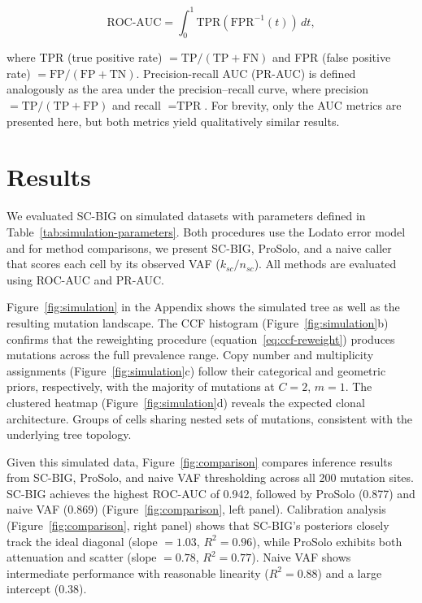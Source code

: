 \documentclass[10pt]{article}
\begin{document}
\begin{equation}
    \text{ROC-AUC} = \int_0^1 \text{TPR}(\text{FPR}^{-1}(t)) \, dt
    ,
\end{equation}

where TPR (true positive rate) $= \text{TP}/(\text{TP}+\text{FN})$ and FPR (false positive rate) $= \text{FP}/(\text{FP}+\text{TN})$.
Precision-recall AUC (PR-AUC) is defined analogously as the area under the precision--recall curve, where precision $= \text{TP}/(\text{TP}+\text{FP})$ and recall $= \text{TPR}$.
For brevity, only the AUC metrics are presented here, but both metrics yield qualitatively similar results.

\section{Results}

We evaluated SC-BIG on simulated datasets with parameters defined in Table~\ref{tab:simulation-parameters}.
Both procedures use the Lodato error model and for method comparisons, we present SC-BIG, ProSolo, and a naive caller that scores each cell by its observed VAF ($k_{sc}/n_{sc}$).
All methods are evaluated using ROC-AUC and PR-AUC.

Figure~\ref{fig:simulation} in the Appendix shows the simulated tree as well as the resulting mutation landscape.
The CCF histogram (Figure~\ref{fig:simulation}b) confirms that the reweighting procedure (equation~\eqref{eq:ccf-reweight}) produces mutations across the full prevalence range.
Copy number and multiplicity assignments (Figure~\ref{fig:simulation}c) follow their categorical and geometric priors, respectively, with the majority of mutations at $C = 2$, $m = 1$. The clustered heatmap (Figure~\ref{fig:simulation}d) reveals the expected clonal architecture.
Groups of cells sharing nested sets of mutations, consistent with the underlying tree topology.

Given this simulated data, Figure~\ref{fig:comparison} compares inference results from SC-BIG, ProSolo, and naive VAF thresholding across all 200 mutation sites.
SC-BIG achieves the highest ROC-AUC of 0.942, followed by ProSolo (0.877) and naive VAF (0.869) (Figure~\ref{fig:comparison}, left panel).
Calibration analysis (Figure~\ref{fig:comparison}, right panel) shows that SC-BIG's posteriors closely track the ideal diagonal (slope $= 1.03$, $R^2 = 0.96$), while ProSolo exhibits both attenuation and scatter (slope $= 0.78$, $R^2 = 0.77$).
Naive VAF shows intermediate performance with reasonable linearity ($R^2 = 0.88$) and a large intercept (0.38).
\end{document}
